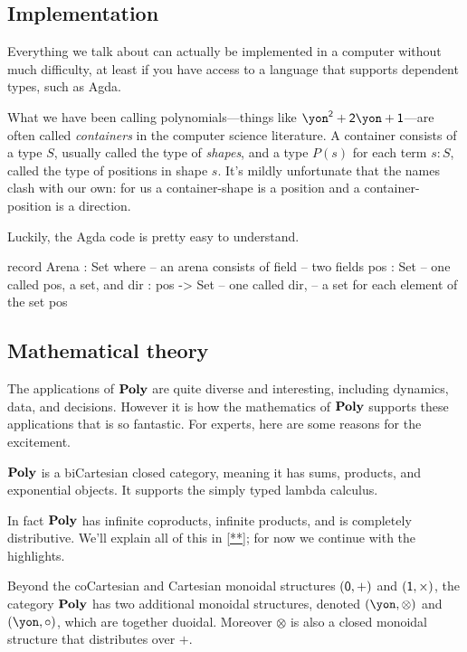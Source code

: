 \documentclass[Book-Poly]{subfiles}
\begin{document}
\subsection{Implementation}

Everything we talk about can actually be implemented in a computer without much difficulty, at least if you have access to a language that supports dependent types, such as Agda.

What we have been calling polynomials---things like $\yon^\2+\2\yon+\1$---are often called \emph{containers} in the computer science literature. A container consists of a type $S$, usually called the type of \emph{shapes}, and a type $P(s)$ for each term $s:S$, called the type of positions in shape $s$. It's mildly unfortunate that the names clash with our own: for us a container-shape is a position and a container-position is a direction.

Luckily, the Agda code is pretty easy to understand.
\begin{agda}
record Arena : Set where  -- an arena consists of 
   field                      -- two fields
     pos : Set                -- one called pos, a set, and
     dir : pos -> Set         -- one called dir,
                              -- a set for each element of the set pos
\end{agda}

\subsection{Mathematical theory}\label{subsec.math_theory}

The applications of $\textbf{Poly}$ are quite diverse and interesting, including dynamics, data, and decisions. However it is how the mathematics of $\textbf{Poly}$ supports these applications that is so fantastic. For experts, here are some reasons for the excitement.

\begin{proposition}
$\textbf{Poly}$ is a biCartesian closed category, meaning it has sums, products, and exponential objects. It supports the simply typed lambda calculus.
\end{proposition}

In fact $\textbf{Poly}$ has infinite coproducts, infinite products, and is completely distributive. We'll explain all of this in \cref{**}; for now we continue with the highlights.

\begin{proposition}
Beyond the coCartesian and Cartesian monoidal structures $(\textsf{0},+)$ and $(\textsf{1},\times)$, the category $\textbf{Poly}$ has two additional monoidal structures, denoted $(\yon,\otimes)$ and $(\yon,\circ)$, which are together duoidal. Moreover $\otimes$ is also a closed monoidal structure that distributes over $+$.
\end{proposition}
\end{document}
